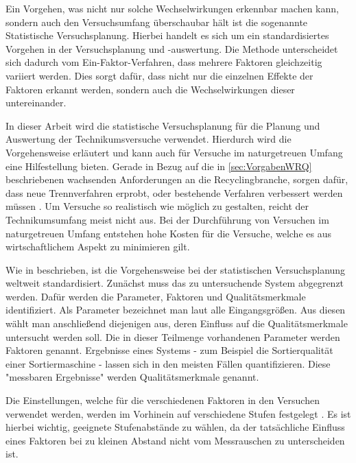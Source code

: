 Ein Vorgehen, was nicht nur solche Wechselwirkungen erkennbar machen kann, sondern auch den Versuchsumfang überschaubar hält ist die sogenannte Statistische Versuchsplanung.
Hierbei handelt es sich um ein standardisiertes Vorgehen in der Versuchsplanung und -auswertung. 
Die Methode unterscheidet sich dadurch vom Ein-Faktor-Verfahren, dass  mehrere Faktoren gleichzeitig variiert werden. Dies sorgt dafür, dass nicht nur die einzelnen Effekte der Faktoren erkannt werden, sondern auch die Wechselwirkungen dieser untereinander.

In dieser Arbeit wird die statistische Versuchsplanung für die Planung und Auswertung der Technikumsversuche verwendet. Hierdurch wird die Vorgehensweise erläutert und kann auch für Versuche im naturgetreuen Umfang eine Hilfestellung bieten. Gerade in Bezug auf die in \ref{sec:VorgabenWRQ} beschriebenen wachsenden Anforderungen an die Recyclingbranche, sorgen dafür, dass neue Trennverfahren erprobt, oder bestehende Verfahren verbessert werden müssen . Um Versuche so realistisch wie möglich zu gestalten, reicht der Technikumsumfang meist nicht aus. Bei der Durchführung von Versuchen im naturgetreuen Umfang entstehen hohe Kosten für die Versuche, welche es aus wirtschaftlichem Aspekt zu minimieren gilt.



Wie in \citet{Siebertz2016} beschrieben, ist die Vorgehensweise bei der statistischen Versuchsplanung weltweit standardisiert.
Zunächst muss das zu untersuchende System abgegrenzt werden. Dafür werden die Parameter, Faktoren und Qualitätsmerkmale identifiziert. Als Parameter bezeichnet man laut \cite{Siebertz2016} alle Eingangsgrößen. Aus diesen wählt man anschließend diejenigen aus, deren Einfluss auf die Qualitätsmerkmale untersucht werden soll. Die in dieser Teilmenge vorhandenen Parameter werden Faktoren genannt.
Ergebnisse eines Systems - zum Beispiel die Sortierqualität einer Sortiermaschine - lassen sich in den meisten Fällen quantifizieren. Diese "messbaren Ergebnisse" \cite{Siebertz2016} werden Qualitätsmerkmale genannt.

Die Einstellungen, welche für die verschiedenen Faktoren in den Versuchen verwendet werden, werden im Vorhinein auf verschiedene Stufen festgelegt \cite{Siebertz2016}. Es ist hierbei wichtig, geeignete Stufenabstände zu wählen, da der tatsächliche Einfluss eines Faktoren bei zu kleinen Abstand nicht vom Messrauschen zu unterscheiden ist.




